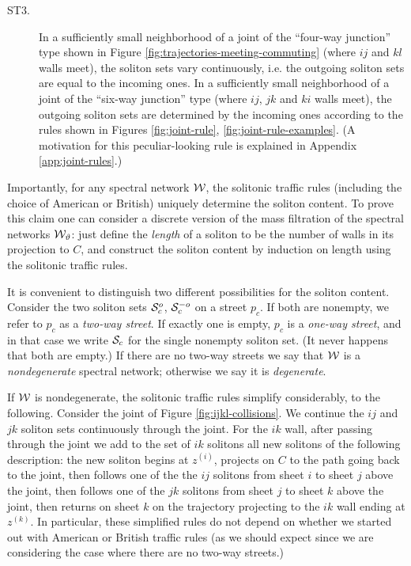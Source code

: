 \documentclass[11pt,a4paper]{article}
\def\wnet {{\cal W}}
\def\CS {{\cal S}}
\newcommand{\ti}[1]{\textit{#1}}
\def\wnet {{\cal W}}
\def\CS {{\cal S}}
\begin{document}
\begin{description}
\item[ST3.] In a sufficiently small neighborhood of
a joint of the ``four-way junction''
type shown in Figure \ref{fig:trajectories-meeting-commuting} (where $ij$ and $kl$ walls meet),
the soliton sets vary continuously, i.e. the outgoing soliton sets are equal to the
incoming ones.
In a sufficiently small neighborhood of a joint of the ``six-way junction'' type
(where $ij$, $jk$ and $ki$ walls meet),
the outgoing soliton sets are
determined by the incoming ones according to the
rules shown in Figures \ref{fig:joint-rule}, \ref{fig:joint-rule-examples}.
(A motivation for this peculiar-looking rule
is explained in Appendix \ref{app:joint-rules}.)

\end{description}

Importantly, for any spectral network $\wnet$, the
solitonic traffic rules (including the choice of American or British)
uniquely determine the soliton content.
To prove this claim one can consider a discrete
version of the mass filtration of the spectral networks $\wnet_\vartheta$:
just define the \ti{length} of a soliton to be the number of walls in its
projection to $C$, and construct the soliton content by induction on length
using the solitonic traffic rules.

It is convenient to distinguish two different possibilities for the soliton content.
Consider the two soliton sets $\CS_c^o$, $\CS_c^{-o}$ on a street $p_c$.
If both are nonempty, we refer to $p_c$ as a
\emph{two-way street}.  If exactly one is empty, $p_c$
is a \emph{one-way street}, and in that case we write $\CS_c$ for the single
nonempty soliton set.  (It never happens that both are empty.)
If there are no two-way streets
we say that $\wnet$ is a \emph{nondegenerate} spectral network; otherwise we
say it is \emph{degenerate}.

If $\wnet$ is nondegenerate, the solitonic traffic rules
simplify considerably, to the following.
Consider the joint of Figure \ref{fig:ijkl-collisions}.  We continue the $ij$ and
$jk$ soliton sets continuously through the joint.
For the $ik$ wall, after passing through the joint we add to the set
of $ik$ solitons all new solitons of the
following description:  the new soliton begins at $z^{(i)}$,
projects on $C$ to the path going back to the joint,
then follows one of the the $ij$ solitons from
sheet $i$ to sheet $j$ above the joint, then follows one of the $jk$ solitons from
sheet $j$ to sheet $k$ above the joint, then returns on sheet $k$ on the
trajectory projecting to the $ik$ wall ending at $z^{(k)}$.
In particular, these simplified rules do not depend on whether we started out with
American or British traffic rules (as we should expect since we are
considering the case where there are no two-way streets.)
\end{document}
